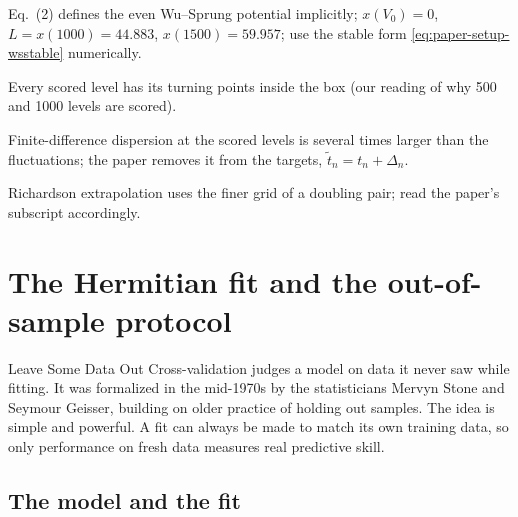 \begin{keyideas}
\item Eq.~(2) defines the even Wu--Sprung potential implicitly; $x(V_0)=0$, $L=x(1000)=44.883$, $x(1500)=59.957$; use the stable form \eqref{eq:paper-setup-wsstable} numerically.
\item Every scored level has its turning points inside the box (our reading of why 500 and 1000 levels are scored).
\item Finite-difference dispersion at the scored levels is several times larger than the fluctuations; the paper removes it from the targets, $\tilde t_n=t_n+\Delta_n$.
\item Richardson extrapolation uses the finer grid of a doubling pair; read the paper's subscript accordingly.
\end{keyideas}

\section{The Hermitian fit and the out-of-sample protocol}\label{sec:paper-setup-protocol}
\begin{didyouknow}{Leave Some Data Out}
Cross-validation judges a model on data it never saw while fitting. It was formalized in the mid-1970s by the statisticians Mervyn Stone and Seymour Geisser, building on older practice of holding out samples. The idea is simple and powerful. A fit can always be made to match its own training data, so only performance on fresh data measures real predictive skill.
\end{didyouknow}

\subsection{The model and the fit}

